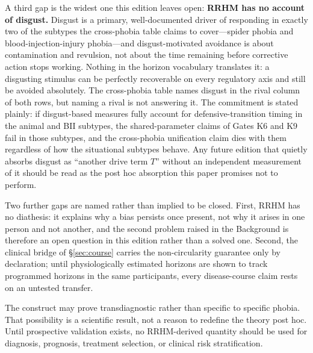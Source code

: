\documentclass[9pt,twocolumn]{article}
\begin{document}
A third gap is the widest one this edition leaves open: \textbf{RRHM has no account of disgust.} Disgust is a primary, well-documented driver of responding in exactly two of the subtypes the cross-phobia table claims to cover---spider phobia and blood-injection-injury phobia---and disgust-motivated avoidance is about contamination and revulsion, not about the time remaining before corrective action stops working. Nothing in the horizon vocabulary translates it: a disgusting stimulus can be perfectly recoverable on every regulatory axis and still be avoided absolutely. The cross-phobia table names disgust in the rival column of both rows, but naming a rival is not answering it. The commitment is stated plainly: if disgust-based measures fully account for defensive-transition timing in the animal and BII subtypes, the shared-parameter claims of Gates K6 and K9 fail in those subtypes, and the cross-phobia unification claim dies with them regardless of how the situational subtypes behave. Any future edition that quietly absorbs disgust as ``another drive term $T$'' without an independent measurement of it should be read as the post hoc absorption this paper promises not to perform.

Two further gaps are named rather than implied to be closed. First, RRHM has no diathesis: it explains why a bias persists once present, not why it arises in one person and not another, and the second problem raised in the Background is therefore an open question in this edition rather than a solved one. Second, the clinical bridge of \S\ref{sec:course} carries the non-circularity guarantee only by declaration; until physiologically estimated horizons are shown to track programmed horizons in the same participants, every disease-course claim rests on an untested transfer.

The construct may prove transdiagnostic rather than specific to specific phobia. That possibility is a scientific result, not a reason to redefine the theory post hoc. Until prospective validation exists, no RRHM-derived quantity should be used for diagnosis, prognosis, treatment selection, or clinical risk stratification.
\end{document}

